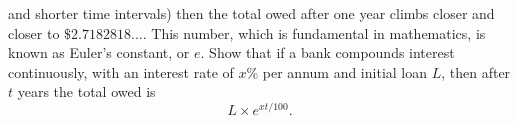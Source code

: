 \begin{questions}
\begin{parts}
            and shorter time intervals) then the total owed after one year climbs closer and closer to $ \$2.7182818... $. This number, which
            is fundamental in mathematics, is known as Euler's constant, or $ e $. Show that if a bank compounds interest continuously, with an
            interest rate of $ x\% $ per annum and initial loan $ L $, then after $ t $ years the total owed is
            \begin{displaymath}
              L \times e^{xt/100}.
            \end{displaymath}
    \end{parts}
\end{questions}


